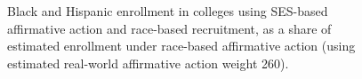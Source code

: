 \begin{figure}[p]
\begin{minipage}[t]{.45\textwidth}
  \end{minipage}%
  \caption{Black and Hispanic enrollment in colleges using SES-based affirmative action and race-based recruitment, as a share of estimated enrollment under race-based affirmative action (using estimated real-world affirmative action weight 260).}
  \label{fig:2}
\end{figure}

